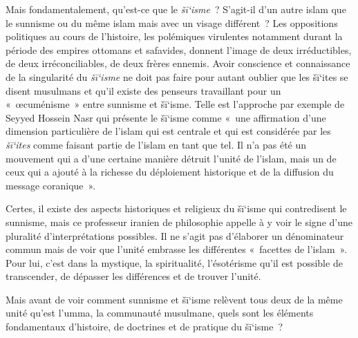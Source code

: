 Mais fondamentalement, qu'est-ce que le \emph{šī`isme}~? S'agit-il d'un
autre islam que le sunnisme ou du même islam mais avec un visage
différent~? Les oppositions politiques au cours de l'histoire, les
polémiques virulentes notamment durant la période des empires ottomans
et safavides, donnent l'image de deux irréductibles, de deux
irréconciliables, de deux frères ennemis. Avoir conscience et
connaissance de la singularité du \emph{šī`isme} ne doit pas faire pour
autant oublier que les šī`ites se disent musulmans et qu'il existe des
penseurs travaillant pour un «~œcuménisme~» entre sunnisme et šī`isme.
Telle est l'approche par exemple de Seyyed Hossein Nasr qui présente le
šī`isme comme «~une affirmation d'une dimension particulière de l'islam
qui est centrale et qui est considérée par les \emph{šī`ites} comme
faisant partie de l'islam en tant que tel. Il n'a pas été un mouvement
qui a d'une certaine manière détruit l'unité de l'islam, mais un de ceux
qui a ajouté à la richesse du déploiement historique et de la diffusion
du message coranique~».

Certes, il existe des aspects historiques et religieux du šī`isme qui
contredisent le sunnisme, mais ce professeur iranien de philosophie
appelle à y voir le signe d'une pluralité d'interprétations possibles.
Il ne s'agit pas d'élaborer un dénominateur commun mais de voir que
l'unité embrasse les différentes «~facettes de l'islam~». Pour lui,
c'est dans la mystique, la spiritualité, l'ésotérisme qu'il est possible
de transcender, de dépasser les différences et de trouver l'unité. 


Mais avant de voir comment sunnisme et šī`isme relèvent tous deux de la
même unité qu'est l'umma, la communauté musulmane, quels sont les
éléments fondamentaux d'histoire, de doctrines et de pratique du
šī`isme~?




